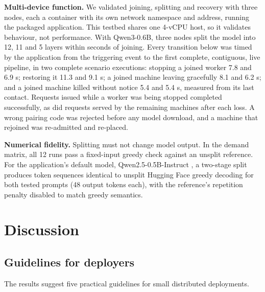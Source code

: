 \documentclass[preprint,12pt]{elsarticle}
\begin{document}
\textbf{Multi-device function.} We validated joining, splitting and
recovery with three nodes, each a container with its own network
namespace and address, running the packaged application. This testbed
shares one 4-vCPU host, so it validates behaviour, not performance. With
Qwen3-0.6B, three nodes split the model into 12, 11 and 5 layers within
seconds of joining. Every transition below was timed by the application
from the triggering event to the first complete, contiguous, live
pipeline, in two complete scenario executions: stopping a joined worker
7.8 and 6.9 s; restoring it 11.3 and 9.1 s; a joined machine leaving
gracefully 8.1 and 6.2 s; and a joined machine killed without notice 5.4
and 5.4 s, measured from its last contact. Requests issued while a
worker was being stopped completed successfully, as did requests served
by the remaining machines after each loss. A wrong pairing code was
rejected before any model download, and a machine that rejoined was
re-admitted and re-placed.

\textbf{Numerical fidelity.} Splitting must not change model output. In
the demand matrix, all 12 runs pass a fixed-input greedy check against
an unsplit reference. For the application's default model,
Qwen2.5-0.5B-Instruct \citep{qwen2025qwen25}, a two-stage split produces
token sequences identical to unsplit Hugging Face greedy decoding for
both tested prompts (48 output tokens each), with the reference's
repetition penalty disabled to match greedy semantics.

\hypertarget{discussion}{%
\section{Discussion}\label{discussion}}

\hypertarget{guidelines-for-deployers}{%
\subsection{Guidelines for deployers}\label{guidelines-for-deployers}}

The results suggest five practical guidelines for small distributed
deployments.
\end{document}
